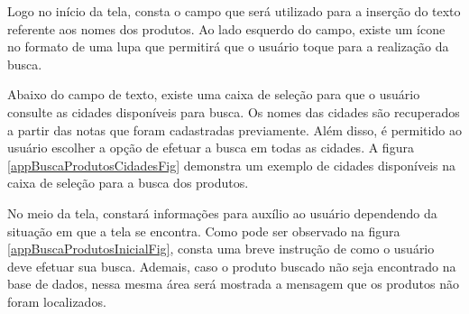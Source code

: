 Logo no início da tela, consta o campo que será utilizado para a inserção do texto referente aos nomes dos produtos. Ao lado esquerdo do campo, existe um ícone no formato de uma lupa que permitirá que o usuário toque para a realização da busca.

Abaixo do campo de texto, existe uma caixa de seleção para que o usuário consulte as cidades disponíveis para busca. Os nomes das cidades são recuperados a partir das notas que foram cadastradas previamente. Além disso, é permitido ao usuário escolher a opção de efetuar a busca em todas as cidades. A figura \ref{appBuscaProdutosCidadesFig} demonstra um exemplo de cidades disponíveis na caixa de seleção para a busca dos produtos.

No meio da tela, constará informações para auxílio ao usuário dependendo da situação em que a tela se encontra. Como pode ser observado na figura \ref{appBuscaProdutosInicialFig}, consta uma breve instrução de como o usuário deve efetuar sua busca. Ademais, caso o produto buscado não seja encontrado na base de dados, nessa mesma área será mostrada a mensagem que os produtos não foram localizados.

